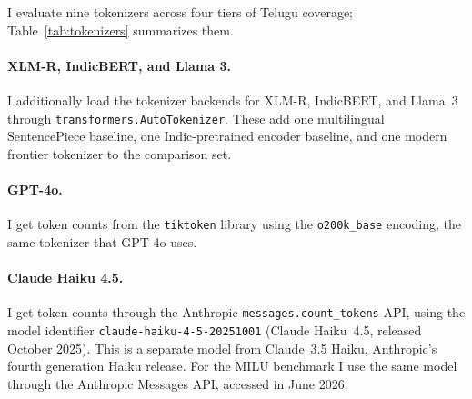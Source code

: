 ﻿\documentclass[11pt]{article}
\begin{document}
I evaluate nine tokenizers across four tiers of Telugu coverage;
Table~\ref{tab:tokenizers} summarizes them.
\begin{table}[H]
\centering
{}
\caption{Tokenizers, backends, and vocabulary sizes.
         \textsuperscript{$\dagger$}Not publicly disclosed by Anthropic.}
\label{tab:tokenizers}
\end{table}

\paragraph{XLM-R, IndicBERT, and Llama 3.}
I additionally load the tokenizer backends for XLM-R, IndicBERT, and
Llama~3 through \texttt{transformers.AutoTokenizer}. These add one
multilingual SentencePiece baseline, one Indic-pretrained encoder
baseline, and one modern frontier tokenizer to the comparison set.
\paragraph{GPT-4o.}
I get token counts from the \texttt{tiktoken} library using the
\texttt{o200k\_base} encoding, the same tokenizer that GPT-4o uses.

\paragraph{Claude Haiku 4.5.}
I get token counts through the Anthropic
\texttt{messages.count\_tokens} API, using the model identifier
\texttt{claude-haiku-4-5-20251001} (Claude Haiku~4.5, released
October 2025). This is a separate model from Claude~3.5 Haiku,
Anthropic's fourth generation Haiku release. For the MILU benchmark
I use the same model through the Anthropic Messages API, accessed
in June 2026.
\end{document}
